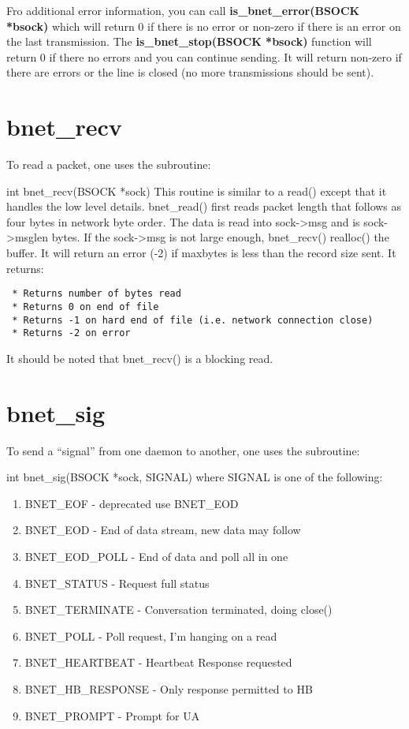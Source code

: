 Fro additional error information, you can call {\bf is\_bnet\_error(BSOCK
*bsock)} which will return 0 if there is no error or non-zero if there is an
error on the last transmission. The {\bf is\_bnet\_stop(BSOCK *bsock)}
function will return 0 if there no errors and you can continue sending. It
will return non-zero if there are errors or the line is closed (no more
transmissions should be sent).

\section{bnet\_recv}

To read a packet, one uses the subroutine:

int bnet\_recv(BSOCK *sock) This routine is similar to a read() except that it
handles the low level details. bnet\_read() first reads packet length that
follows as four bytes in network byte order. The data is read into
sock-{\textgreater}msg and is sock-{\textgreater}msglen bytes. If the sock-{\textgreater}msg is not large
enough, bnet\_recv() realloc() the buffer. It will return an error (-2) if
maxbytes is less than the record size sent. It returns:

\footnotesize
\begin{verbatim}
 * Returns number of bytes read
 * Returns 0 on end of file
 * Returns -1 on hard end of file (i.e. network connection close)
 * Returns -2 on error
\end{verbatim}
\normalsize

It should be noted that bnet\_recv() is a blocking read.

\section{bnet\_sig}

To send a ``signal'' from one daemon to another, one uses the subroutine:

int bnet\_sig(BSOCK *sock, SIGNAL) where SIGNAL is one of the following:

\begin{enumerate}
\item BNET\_EOF - deprecated use BNET\_EOD
\item BNET\_EOD - End of data stream, new data may follow
\item BNET\_EOD\_POLL - End of data and poll all in one
\item BNET\_STATUS - Request full status
\item BNET\_TERMINATE - Conversation terminated, doing close()
\item BNET\_POLL - Poll request, I'm hanging on a read
\item BNET\_HEARTBEAT - Heartbeat Response requested
\item BNET\_HB\_RESPONSE - Only response permitted to HB
\item BNET\_PROMPT - Prompt for UA
   \end{enumerate}

